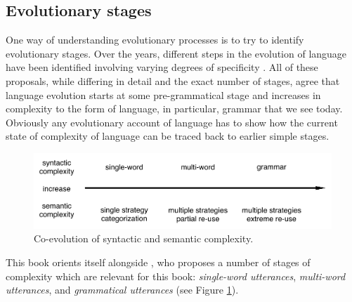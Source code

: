\subsection{Evolutionary stages}
\label{s:stages}
One way of understanding evolutionary processes is to try to identify
evolutionary stages. Over the years, different steps in the evolution
of language have been identified involving varying degrees of 
specificity \citep{bickerton1999language,jackendoff1999possible,steels2005emergence}. 
All of these proposals, while differing in detail and the exact number of stages,
agree that language evolution starts at some pre-grammatical stage and 
increases in complexity to the form of language, in particular, grammar 
that we see today. Obviously any evolutionary account of language has to show how 
the current state of complexity of language can be traced back to earlier simple stages. 


\begin{figure}
\includegraphics[width=1\columnwidth]{figs/co-evolution-complexity}
\caption[Co-evolution of syntactic and semantic complexity.]{Co-evolution of syntactic and semantic complexity.}
\label{f:co-evolution-complexity}
\end{figure}

This book orients itself alongside \cite{steels2005emergence}, who proposes
a number of stages of complexity which are relevant for this book:
\emph{single-word utterances}, \emph{multi-word utterances}, and \emph{grammatical utterances}
(see Figure \ref{f:co-evolution-complexity}). 
 
